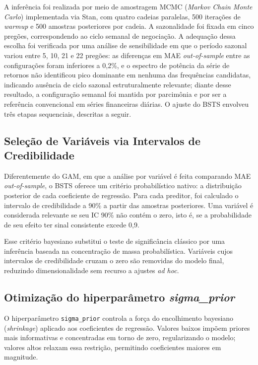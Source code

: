 \documentclass[	12pt, Times, openright, oneside, a4paper, english, brazil]{abntex2}
\begin{document}
A inferência foi realizada por meio de amostragem MCMC (\textit{Markov Chain Monte Carlo}) implementada via Stan, com quatro cadeias paralelas, 500 iterações de \textit{warmup} e 500 amostras posteriores por cadeia. A sazonalidade foi fixada em cinco pregões, correspondendo ao ciclo semanal de negociação. A adequação dessa escolha foi verificada por uma análise de sensibilidade em que o período sazonal variou entre 5, 10, 21 e 22 pregões: as diferenças em MAE \textit{out-of-sample} entre as configurações foram inferiores a 0,2\%, e o espectro de potência da série de retornos não identificou pico dominante em nenhuma das frequências candidatas, indicando ausência de ciclo sazonal estruturalmente relevante; diante desse resultado, a configuração semanal foi mantida por parcimônia e por ser a referência convencional em séries financeiras diárias. O ajuste do BSTS envolveu três etapas sequenciais, descritas a seguir.

\subsection{Seleção de Variáveis via Intervalos de Credibilidade}

Diferentemente do GAM, em que a análise por variável é feita comparando MAE \textit{out-of-sample}, o BSTS oferece um critério probabilístico nativo: a distribuição posterior de cada coeficiente de regressão. Para cada preditor, foi calculado o intervalo de credibilidade a 90\% a partir das amostras posteriores. Uma variável é considerada relevante se seu IC 90\% não contém o zero, isto é, se a probabilidade de seu efeito ter sinal consistente excede 0,9.

Esse critério bayesiano substitui o teste de significância clássico por uma inferência baseada na concentração de massa probabilística. Variáveis cujos intervalos de credibilidade cruzam o zero são removidas do modelo final, reduzindo dimensionalidade sem recurso a ajustes \textit{ad hoc}.

\subsection{Otimização do hiperparâmetro \textit{sigma\_prior}}

O hiperparâmetro \texttt{sigma\_prior} controla a força do encolhimento bayesiano (\textit{shrinkage}) aplicado aos coeficientes de regressão. Valores baixos impõem priores mais informativas e concentradas em torno de zero, regularizando o modelo; valores altos relaxam essa restrição, permitindo coeficientes maiores em magnitude.
\end{document}
